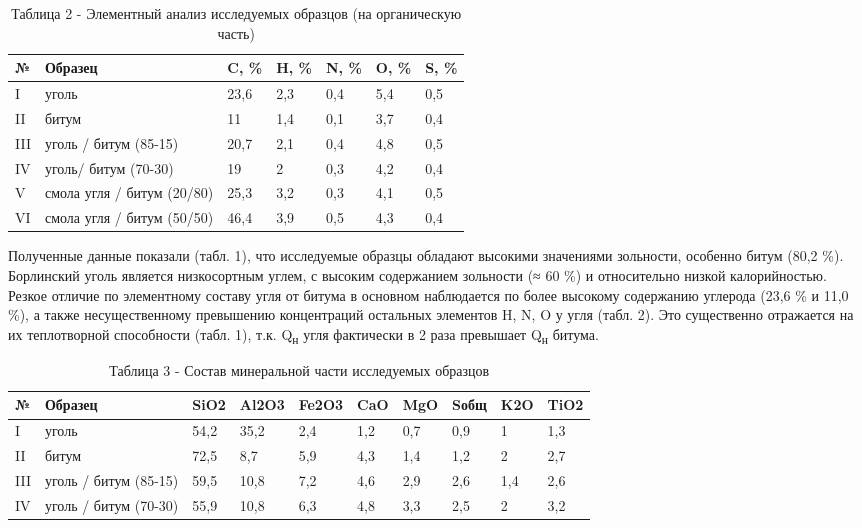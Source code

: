 \begin{table}[H]
\caption*{Таблица 2 - Элементный анализ исследуемых образцов (на органическую часть)}
\centering
\begin{tabular}{|l|l|l|l|l|l|l|}
\hline
№ & Образец & C, \% & H, \% & N, \% & O, \% & S, \% \\ \hline
I & уголь & 23,6 & 2,3 & 0,4 & 5,4 & 0,5 \\ \hline
II & битум & 11 & 1,4 & 0,1 & 3,7 & 0,4 \\ \hline
III & уголь / битум (85-15) & 20,7 & 2,1 & 0,4 & 4,8 & 0,5 \\ \hline
IV & уголь/ битум (70-30) & 19 & 2 & 0,3 & 4,2 & 0,4 \\ \hline
V & смола угля / битум (20/80) & 25,3 & 3,2 & 0,3 & 4,1 & 0,5 \\ \hline
VI & смола угля / битум (50/50) & 46,4 & 3,9 & 0,5 & 4,3 & 0,4 \\ \hline
\end{tabular}
\end{table}

\begin{multicols}{2}
Полученные данные показали (табл. 1), что исследуемые образцы обладают
высокими значениями зольности, особенно битум (80,2 \%). Борлинский
уголь является низкосортным углем, с высоким содержанием зольности (≈ 60
\%) и относительно низкой калорийностью. Резкое отличие по элементному
составу угля от битума в основном наблюдается по более высокому
содержанию углерода (23,6 \% и 11,0 \%), а также несущественному
превышению концентраций остальных элементов H, N, O у угля (табл. 2).
Это существенно отражается на их теплотворной способности (табл. 1),
т.к. Q\textsubscript{н} угля фактически в 2 раза превышает
Q\textsubscript{н} битума.
\end{multicols}

\begin{table}[H]
\caption*{Таблица 3 - Состав минеральной части исследуемых образцов}
\centering
\begin{tabular}{|l|l|l|l|l|l|l|l|l|l|}
\hline
№ & Образец & SiO2 & Al2O3 & Fe2O3 & CaO & MgO & Sобщ & K2O & TiO2 \\ \hline
I & уголь & 54,2 & 35,2 & 2,4 & 1,2 & 0,7 & 0,9 & 1 & 1,3 \\ \hline
II & битум & 72,5 & 8,7 & 5,9 & 4,3 & 1,4 & 1,2 & 2 & 2,7 \\ \hline
III & уголь / битум (85-15) & 59,5 & 10,8 & 7,2 & 4,6 & 2,9 & 2,6 & 1,4 & 2,6 \\ \hline
IV & уголь / битум (70-30) & 55,9 & 10,8 & 6,3 & 4,8 & 3,3 & 2,5 & 2 & 3,2 \\ \hline
\end{tabular}
\end{table}

